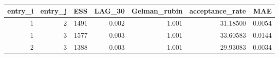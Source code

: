 \begin{longtable}{rrrrrrr}
\toprule
entry\_i & entry\_j & ESS & LAG\_30 & Gelman\_rubin & acceptance\_rate & MAE \\ 
\midrule
1 & 2 & 1491 & 0.002 & 1.001 & 31.18500 & 0.0054 \\ 
1 & 3 & 1577 & -0.003 & 1.001 & 33.60583 & 0.0144 \\ 
2 & 3 & 1388 & 0.003 & 1.001 & 29.93083 & 0.0034 \\ 
\bottomrule
\end{longtable}

